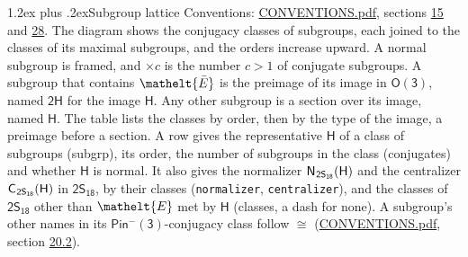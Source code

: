 \documentclass[10pt,a4paper]{article}
\makeatletter
\renewcommand\section{\@startsection{section}{1}{\z@}{-3ex plus -1ex minus -.2ex}%
  {1.2ex plus .2ex}{\normalfont\large\sffamily\bfseries\color{parttitle}}}
\numberwithin{equation}{section}
\newcommand{\eltfont}[1]{{\let\sigma\eltsigma\mathelt{#1}}}
\newcommand{\grp}[1]{\mathsf{#1}}
\newcommand{\cls}[1]{\eltfont{#1}}
\newcommand{\elt}[1]{\eltfont{#1}}
\newcommand{\samecls}{\cong}
\newcommand{\barred}[1]{\bar{#1}}
\newcommand{\hairsp}{\mkern1mu}
\makeatother
\begin{document}
\section{Subgroup lattice}\label{s:subgroups}
Conventions: \href{../../CONVENTIONS.pdf}{CONVENTIONS.pdf}, sections \href{../../../rotation/CONVENTIONS.pdf\#conv.15}{15} and \href{../../CONVENTIONS.pdf\#conv.28}{28}.
The diagram shows the conjugacy classes of subgroups, each joined to the classes of its maximal subgroups, and the orders increase upward. \label{n:index.conjugates.c}A normal subgroup is framed, and ${\times}c$ is the number $c > 1$ of conjugate subgroups. \label{n:group.H}A subgroup that contains $\elt{\barred{E}}$ is the preimage of its image in $\grp{O(3)}$, named $\grp{2H}$ for the image $\grp{H}$. Any other subgroup is a section over its image, named $\grp{H}$. The table lists the classes by order, then by the type of the image, a preimage before a section. \label{n:head.subgroup}\label{n:head.order}\label{n:head.conjugates}\label{n:head.normal}A row gives the representative $\grp{H}$ of a class of subgroups (subgrp), its order, the number of subgroups in the class (conjugates) and whether $\grp{H}$ is normal. \label{n:group.normalizer}\label{n:group.centralizer}\label{n:head.classes}It also gives the normalizer $\grp{N}_{\hairsp \grp{2S_{18}}}(\grp{H})$ and the centralizer $\grp{C}_{\hairsp \grp{2S_{18}}}(\grp{H})$ in $\grp{2S_{18}}$, by their classes (\texttt{normalizer}, \texttt{centralizer}), and the classes of $\grp{2S_{18}}$ other than $\cls{E}$ met by $\grp{H}$ (classes, a dash for none). A subgroup's other names in its \href{Pinminus3.pdf}{$\grp{Pin^{-}(3)}$}-conjugacy class follow $\samecls$ (\href{../../CONVENTIONS.pdf}{CONVENTIONS.pdf}, section \href{../../CONVENTIONS.pdf\#conv.20.2}{20.2}).
\end{document}
